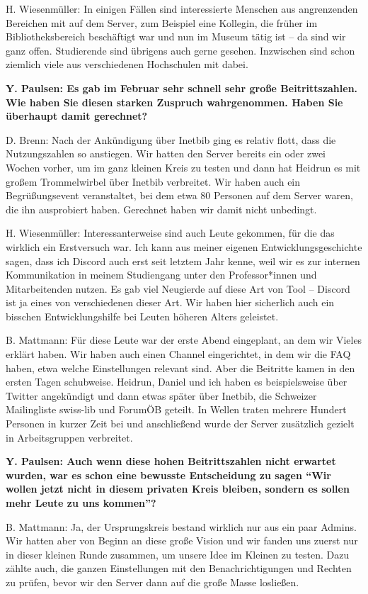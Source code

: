 \documentclass[a4paper,
fontsize=11pt,
oneside,
numbers=noperiodatend,
parskip=half-,
bibliography=totoc,
final
]{scrartcl}
\begin{document}
H. Wiesenmüller: In einigen Fällen sind interessierte Menschen aus
angrenzenden Bereichen mit auf dem Server, zum Beispiel eine Kollegin,
die früher im Bibliotheksbereich beschäftigt war und nun im Museum tätig
ist -- da sind wir ganz offen. Studierende sind übrigens auch gerne
gesehen. Inzwischen sind schon ziemlich viele aus verschiedenen
Hochschulen mit dabei.

\textbf{Y. Paulsen: Es gab im Februar sehr schnell sehr große
Beitrittszahlen. Wie haben Sie diesen starken Zuspruch wahrgenommen.
Haben Sie überhaupt damit gerechnet?}

D. Brenn: Nach der Ankündigung über Inetbib ging es relativ flott, dass
die Nutzungszahlen so anstiegen. Wir hatten den Server bereits ein oder
zwei Wochen vorher, um im ganz kleinen Kreis zu testen und dann hat
Heidrun es mit großem Trommelwirbel über Inetbib verbreitet. Wir haben
auch ein Begrüßungsevent veranstaltet, bei dem etwa 80 Personen auf dem
Server waren, die ihn ausprobiert haben. Gerechnet haben wir damit nicht
unbedingt.

H. Wiesenmüller: Interessanterweise sind auch Leute gekommen, für die
das wirklich ein Erstversuch war. Ich kann aus meiner eigenen
Entwicklungsgeschichte sagen, dass ich Discord auch erst seit letztem
Jahr kenne, weil wir es zur internen Kommunikation in meinem Studiengang
unter den Professor*innen und Mitarbeitenden nutzen. Es gab viel
Neugierde auf diese Art von Tool -- Discord ist ja eines von
verschiedenen dieser Art. Wir haben hier sicherlich auch ein bisschen
Entwicklungshilfe bei Leuten höheren Alters geleistet.

B. Mattmann: Für diese Leute war der erste Abend eingeplant, an dem wir
Vieles erklärt haben. Wir haben auch einen Channel eingerichtet, in dem
wir die FAQ haben, etwa welche Einstellungen relevant sind. Aber die
Beitritte kamen in den ersten Tagen schubweise. Heidrun, Daniel und ich
haben es beispielsweise über Twitter angekündigt und dann etwas später
über Inetbib, die Schweizer Mailingliste swiss-lib und ForumÖB geteilt.
In Wellen traten mehrere Hundert Personen in kurzer Zeit bei und
anschließend wurde der Server zusätzlich gezielt in Arbeitsgruppen
verbreitet.

\textbf{Y. Paulsen: Auch wenn diese hohen Beitrittszahlen nicht erwartet
wurden, war es schon eine bewusste Entscheidung zu sagen \enquote{Wir wollen
jetzt nicht in diesem privaten Kreis bleiben, sondern es sollen mehr
Leute zu uns kommen}?}

B. Mattmann: Ja, der Ursprungskreis bestand wirklich nur aus ein paar
Admins. Wir hatten aber von Beginn an diese große Vision und wir fanden
uns zuerst nur in dieser kleinen Runde zusammen, um unsere Idee im
Kleinen zu testen. Dazu zählte auch, die ganzen Einstellungen mit den
Benachrichtigungen und Rechten zu prüfen, bevor wir den Server dann auf
die große Masse losließen.
\end{document}
